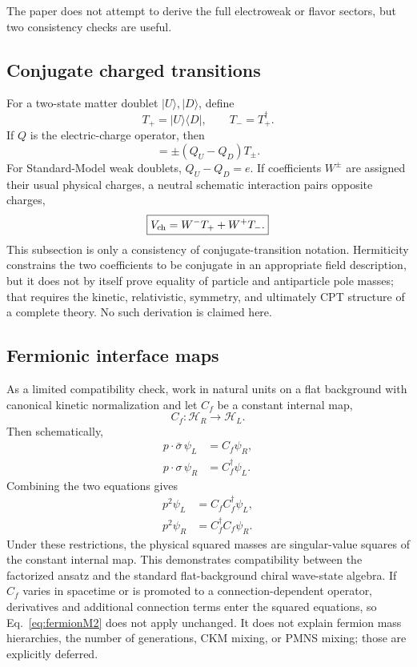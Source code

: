 \documentclass[10pt]{article}
\begin{document}
The paper does not attempt to derive the full electroweak or flavor sectors, but two consistency checks are useful.

\subsection{Conjugate charged transitions}

For a two-state matter doublet $|U\rangle,|D\rangle$, define
\begin{equation}
T_+=|U\rangle\langle D|,
\qquad
T_-=T_+^\dagger.
\label{eq:Tpm}
\end{equation}
If $Q$ is the electric-charge operator, then
\begin{equation}
[Q,T_\pm]
=\pm(Q_U-Q_D)T_\pm.
\label{eq:chargeComm}
\end{equation}
For Standard-Model weak doublets, $Q_U-Q_D=e$. If coefficients $W^\pm$ are assigned their usual physical charges, a neutral schematic interaction pairs opposite charges,
\begin{equation}
\boxed{
V_{\rm ch}=W^-T_+ + W^+T_-.
}
\label{eq:chargedPairing}
\end{equation}
This subsection is only a consistency of conjugate-transition notation. Hermiticity constrains the two coefficients to be conjugate in an appropriate field description, but it does not by itself prove equality of particle and antiparticle pole masses; that requires the kinetic, relativistic, symmetry, and ultimately CPT structure of a complete theory. No such derivation is claimed here.

\subsection{Fermionic interface maps}

As a limited compatibility check, work in natural units on a flat background with canonical kinetic normalization and let $C_f$ be a constant internal map,
\begin{equation}
C_f:\mathcal H_R\rightarrow\mathcal H_L.
\end{equation}
Then schematically,
\begin{align}
p\!\cdot\!\bar\sigma\,\psi_L&=C_f\psi_R,
\\
p\!\cdot\!\sigma\,\psi_R&=C_f^\dagger\psi_L.
\end{align}
Combining the two equations gives
\begin{align}
p^2\psi_L&=C_fC_f^\dagger\psi_L,
\\
p^2\psi_R&=C_f^\dagger C_f\psi_R.
\label{eq:fermionM2}
\end{align}
Under these restrictions, the physical squared masses are singular-value squares of the constant internal map. This demonstrates compatibility between the factorized ansatz and the standard flat-background chiral wave-state algebra. If $C_f$ varies in spacetime or is promoted to a connection-dependent operator, derivatives and additional connection terms enter the squared equations, so Eq.~\eqref{eq:fermionM2} does not apply unchanged. It does not explain fermion mass hierarchies, the number of generations, CKM mixing, or PMNS mixing; those are explicitly deferred.
\end{document}
